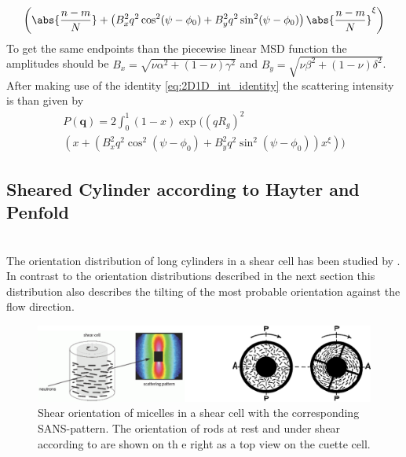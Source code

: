 \begin{itemize}
\begin{multline}
    \left(
      \abs{\frac{n-m}{N}} + \left(B_x^2q^2\cos^2(\psi-\phi_0)+B_y^2q^2\sin^2(\psi-\phi_0)\right)\abs{\frac{n-m}{N}}^\xi
    \right)
    \end{multline}
    To get the same endpoints than the piecewise linear MSD function the amplitudes should be $B_x=\sqrt{\nu\alpha^2+(1-\nu)\gamma^2}$ and $B_y=\sqrt{\nu\beta^2+(1-\nu)\delta^2}$.
    After making use of the identity \ref{eq:2D1D_int_identity} the scattering intensity is than given by
    \begin{multline}
      P(\mathbf{q}) = 2 \int_0^1 (1-x) \exp\Bigg( \left(qR_g\right)^2\\
      \left(
      x + \left(B_x^2q^2\cos^2(\psi-\phi_0)+B_y^2q^2\sin^2(\psi-\phi_0)\right)x^\xi
      \right)\Bigg)
    \end{multline}
\end{itemize}
\newpage
\subsection{Sheared Cylinder according to Hayter and Penfold}
\label{sect:ShearedCylinderHayterPenfold}
\hspace{1pt}\\
The orientation distribution of long cylinders in a shear cell has been studied by \cite{Scheraga1951,Jerrard1959,Hayter1984}. In contrast to the orientation distributions described in the next section this distribution also describes the tilting of the most probable orientation against the flow direction.
\begin{figure}[htb]
\begin{center}
\includegraphics[width=\textwidth]{sheared_cylinders_n_phi0.png}
\end{center}
\caption{Shear orientation of micelles in a shear cell with the
corresponding SANS-pattern. The orientation of rods at rest and under shear according to \cite{Scheraga1951} are shown on th e right as a top view on the cuette cell.} \label{sheared_cylinders1}
\end{figure}

